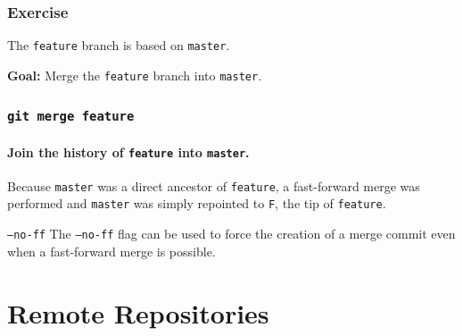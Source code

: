 \documentclass{beamer}
\newcommand\gitcmd[1]{\texttt{git #1}}
\newcommand\gflag[1]{\texttt{#1}}
\newcommand\grefspec[1]{\texttt{#1}}
\newcommand\gbranch[1]{\texttt{#1}}
\newcommand\goal[1]{\textbf{Goal:} #1}
\begin{document}
\begin{frame}
  \frametitle{Exercise}

  The \gbranch{feature} branch is based on \gbranch{master}.

  \goal{Merge the \gbranch{feature} branch into \gbranch{master}.}
  
  \begin{figure}
    \centering
  \end{figure}
\end{frame}

\begin{frame}
  \frametitle{\gitcmd{merge feature}}
  \framesubtitle{Join the history of \gbranch{feature} into \gbranch{master}.}
  
  \begin{figure}
    \centering
  \end{figure}

  Because \gbranch{master} was a direct ancestor of \gbranch{feature}, a fast-forward merge was performed and \gbranch{master} was simply repointed to \grefspec{F}, the tip of \gbranch{feature}.
  \vfill
  \begin{block}{\gflag{--no-ff}}
    The \gflag{--no-ff} flag can be used to force the creation of a merge commit even when a fast-forward merge is possible.
  \end{block}
\end{frame}

\section{Remote Repositories}
\end{document}
